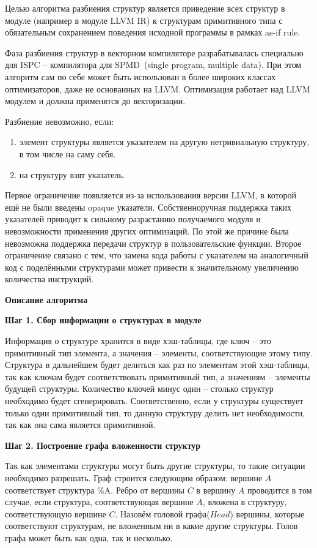 Целью алгоритма разбиения структур является приведение всех структур в модуле (например в модуле LLVM IR) к структурам примитивного типа с обязательным сохранением поведения исходной программы в рамках as-if rule.

Фаза разбиения структур в векторном компиляторе разрабатывалась специально для ISPC -- компилятора для SPMD~(single program, multiple data).
При этом алгоритм сам по себе может быть использован в более широких классах оптимизаторов, даже не основанных на LLVM.
Оптимизация работает над LLVM модулем и должна применятся до векторизации.

Разбиение невозможно, если:
\begin{enumerate}
\item элемент структуры является указателем на другую нетривиальную структуру, в том числе на саму себя.
\item на структуру взят указатель.
\end{enumerate}

Первое ограничение появляется из-за использования версии LLVM, в которой ещё не были введены opaque указатели.
Собственноручная поддержка таких указателей приводит к сильному разрастанию получаемого модуля и невозможности применения других оптимизаций.
По этой же причине была невозможна поддержка передачи структур в пользовательские функции.
Второе ограничение связано с тем, что замена кода работы с указателем на аналогичный код с поделёнными структурами может привести к значительному увеличению количества инструкций.

\textbf{Описание алгоритма}

\textbf{Шаг 1. Сбор информации о структурах в модуле}

Информация о структуре хранится в виде хэш-таблицы, где ключ -- это примитивный тип элемента, а значения -- элементы, соответствующие этому типу. Структура в дальнейшем будет делиться как раз по элементам этой хэш-таблицы, так как ключам будет соответствовать примитивный тип, а значениям -- элементы будущей структуры. 
Количество ключей минус один -- столько структур необходимо будет сгенерировать.
Соответственно, если у структуры существует только один примитивный тип, то данную структуру делить нет необходимости, так как она сама является примитивной.

\textbf{Шаг 2. Построение графа вложенности структур}

Так как элементами структуры могут быть другие структуры, то такие ситуации необходимо разрешать.
Граф строится следующим образом: вершине $A$ соответствует структура \%A.
Ребро от вершины $C$ в вершину $A$ проводится в том случае, если структура, соответствующая вершине $A$, вложена в структуру, соответствующую вершине $C$.
Назовём головой графа($Head$) вершины, которые соответствуют структурам, не вложенным ни в какие другие структуры.
Голов графа может быть как одна, так и несколько.

